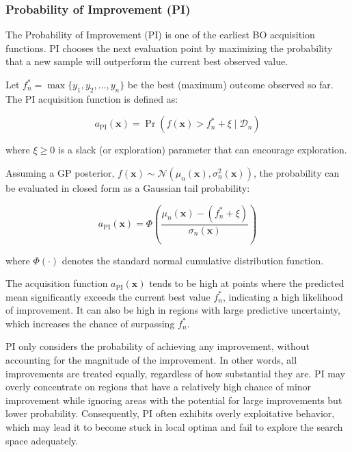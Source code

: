 \documentclass{ut-thesis}
\begin{document}
\subsubsection{Probability of Improvement (PI)}

The Probability of Improvement (PI) is one of the earliest BO acquisition functions\cite{kushner1964new}. PI chooses the next evaluation point by maximizing the probability that a new sample will outperform the current best observed value.

Let $f_n^* = \max \{ y_1, y_2, \dots, y_n \}$ be the best (maximum) outcome observed so far. The PI acquisition function is defined as:

\begin{equation}
    a_{\text{PI}}(\mathbf{x}) = \Pr\left( f(\mathbf{x}) > f_n^* + \xi \mid \mathcal{D}_n \right)
\end{equation}

where $\xi \geq 0$ is a slack (or exploration) parameter that can encourage exploration.

Assuming a GP posterior, $f(\mathbf{x}) \sim \mathcal{N}(\mu_n(\mathbf{x}), \sigma_n^2(\mathbf{x}))$, the probability can be evaluated in closed form as a Gaussian tail probability:

\begin{equation}
    a_{\text{PI}}(\mathbf{x}) = \Phi\left( \frac{\mu_n(\mathbf{x}) - (f_n^* + \xi)}{\sigma_n(\mathbf{x})} \right)
\end{equation}

where $\Phi(\cdot)$ denotes the standard normal cumulative distribution function.

The acquisition function $a_{\text{PI}}(\mathbf{x})$ tends to be high at points where the predicted mean significantly exceeds the current best value $f_n^*$, indicating a high likelihood of improvement. It can also be high in regions with large predictive uncertainty, which increases the chance of surpassing $f_n^*$.

PI only considers the probability of achieving any improvement, without accounting for the magnitude of the improvement. In other words, all improvements are treated equally, regardless of how substantial they are. PI may overly concentrate on regions that have a relatively high chance of minor improvement while ignoring areas with the potential for large improvements but lower probability. Consequently, PI often exhibits overly exploitative behavior, which may lead it to become stuck in local optima and fail to explore the search space adequately.
\end{document}
